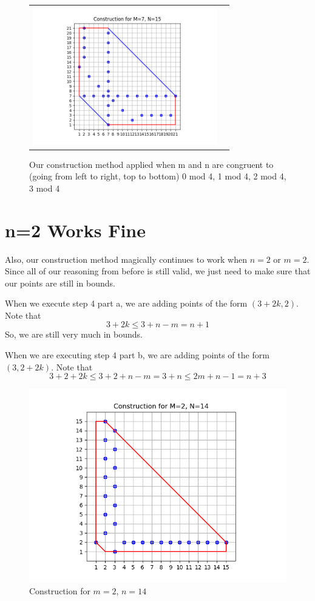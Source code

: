 \documentclass[10pt]{../usamts}
\begin{document}
\begin{solution}
\begin{figure}[htbp]
\begin{tabular}{c c}
    \includegraphics[width=8cm]{round2/p5construct/construct_7_15.png}\\
    \end{tabular}
    \caption{Our construction method applied when m and n are congruent to (going from left to right, top to bottom) 0 mod 4, 1 mod 4, 2 mod 4, 3 mod 4}
    \label{fig:congconstruct}
\end{figure}

\clearpage
\section*{n=2 Works Fine}
Also, our construction method magically continues to work when $n = 2$ or $m = 2$. Since all of our reasoning from before is still valid, we just need to make sure that our points are still in bounds.

When we execute step 4 part a, we are adding points of the form $(3+2k, 2)$. Note that $$3+2k \leq 3 + n - m = n + 1$$ So, we are still very much in bounds.

When we are executing step 4 part b, we are adding points of the form $(3,2+2k)$. Note that
$$3 + 2 + 2k \leq 3 + 2 + n-m = 3 + n \leq 2m+n-1 = n+3$$

\begin{figure}[ht]
\centering
    \includegraphics[width=12cm]{round2/p5construct/construct_2_14.png}
    \caption{Construction for $m=2$, $n=14$}
    \label{fig:131construct}
\end{figure}


\end{solution}
\end{document}
